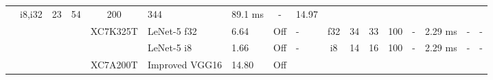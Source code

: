 \begin{table}
\begin{adjustbox}{totalheight=\baselineskip,}
\begin{tabular}{ccccclp{2em}cp{3em}cp{2em}p{4em}p{3em}p{3.5em}p{3.5em}p{2.5em}p{3em}}
                                   &\multirow{1}{*}{i8,i32}
                                       &\multirow{1}{*}{23}
                                           &\multirow{1}{*}{54}
                                               &\multirow{1}{*}{200}
                                                   &\multirow{1}{*}{344}
                                                       &\multirow{1}{*}{89.1 ms}
                                                           &\multirow{1}{*}{-}
                                                               &\multirow{1}{*}{14.97}\\
\cmidrule{4-17}
   &   &   &\multirow{2}{*}{\cite{weiFPGABasedHybridTypeImplementation2019}}
               &\multirow{2}{*}{XC7K325T}
                   &\multirow{1}{*}{LeNet-5 f32}
                       &\multirow{1}{*}{6.64}
                           &\multirow{1}{*}{Off}
                               &\multirow{1}{*}{-}
                                   &\multirow{1}{*}{f32}
                                       &\multirow{1}{*}{34}
                                           &\multirow{1}{*}{33}
                                               &\multirow{1}{*}{100}
                                                   &\multirow{1}{*}{-}
                                                       &\multirow{1}{*}{2.29 ms}
                                                           &\multirow{1}{*}{-}
                                                               &\multirow{1}{*}{-}\\
   &   &   &   &   &\multirow{1}{*}{LeNet-5 i8}
                       &\multirow{1}{*}{1.66}
                           &\multirow{1}{*}{Off}
                               &\multirow{1}{*}{-}
                                   &\multirow{1}{*}{i8}
                                       &\multirow{1}{*}{14}
                                           &\multirow{1}{*}{16}
                                               &\multirow{1}{*}{100}
                                                   &\multirow{1}{*}{-}
                                                       &\multirow{1}{*}{2.29 ms}
                                                           &\multirow{1}{*}{-}
                                                               &\multirow{1}{*}{-}\\
\cmidrule{4-17}
   &   &   &\multirow{2}{*}{\cite{yanAutomaticDeploymentConvolutional2022a}}
               &\multirow{2}{*}{XC7A200T}
                   &\multirow{1}{*}{Improved VGG16}
                       &\multirow{1}{*}{14.80}
                           &\multirow{1}{*}{Off}

\end{tabular}
\end{adjustbox}
\end{table}
